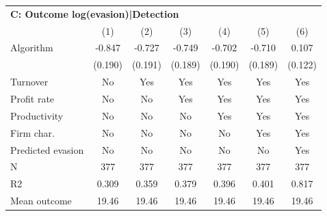 \begin{tabular}{lcccccc}
\midrule \multicolumn{7}{l}{\textbf{C: Outcome log(evasion)|Detection}} \\ \multicolumn{1}{l}{} & (1) & (2) & (3) & (4) & (5) & (6) \\ \midrule
Algorithm   &      -0.847\sym{***}&      -0.727\sym{***}&      -0.749\sym{***}&      -0.702\sym{***}&      -0.710\sym{***}&       0.107         \\
            &     (0.190)         &     (0.191)         &     (0.189)         &     (0.190)         &     (0.189)         &     (0.122)         \\
\midrule
Turnover    &          No         &         Yes         &         Yes         &         Yes         &         Yes         &         Yes         \\
Profit rate &          No         &          No         &         Yes         &         Yes         &         Yes         &         Yes         \\
Productivity&          No         &          No         &          No         &         Yes         &         Yes         &         Yes         \\
Firm char.  &          No         &          No         &          No         &          No         &         Yes         &         Yes         \\
Predicted evasion&          No         &          No         &          No         &          No         &          No         &         Yes         \\
N           &         377         &         377         &         377         &         377         &         377         &         377         \\
R2          &       0.309         &       0.359         &       0.379         &       0.396         &       0.401         &       0.817         \\
Mean outcome&       19.46         &       19.46         &       19.46         &       19.46         &       19.46         &       19.46         \\
\bottomrule \end{tabular}
